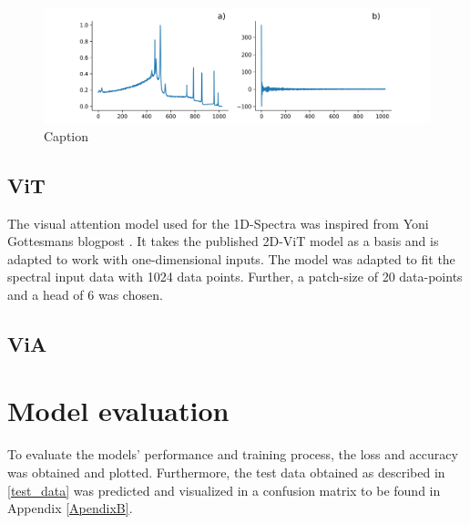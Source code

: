 \begin{figure}[H]
    \centering
    \includegraphics{Figures/dct.png}
    \caption{Caption}
    \label{fig:dct}
\end{figure}

\subsection{ViT}
The visual attention model used for the 1D-Spectra was inspired from Yoni Gottesmans blogpost \cite{noauthor_interpretable_2023}. It takes the published 2D-ViT model  as a basis and is adapted to work with one-dimensional inputs.
The model was adapted to fit the spectral input data with 1024 data points. Further, a patch-size of 20 data-points and a head of 6 was chosen.



\subsection{ViA}




\section{Model evaluation}

To evaluate the models' performance and training process, the loss and accuracy was obtained and plotted. Furthermore, the test data obtained as described in \ref{test_data} was predicted and visualized in a confusion matrix to be found in Appendix \ref{ApendixB}.